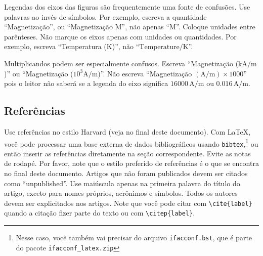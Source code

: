Legendas dos eixos das figuras são frequentemente uma fonte de confusões. Use
palavras ao invés de símbolos. Por exemplo, escreva a quantidade ``Magnetização'',
ou ``Magnetização M'', não apenas ``M''. Coloque unidades entre parênteses. Não marque
os eixos apenas com unidades ou quantidades. Por exemplo, escreva 
``Temperatura ($\mathrm{K}$)'', não ``$\mbox{Temperature}/\mathrm{K}$''.

Multiplicandos podem ser especialmente confusos. Escreva  ``Magnetização 
($\mathrm{kA}/\mathrm{m}$)'' ou ``Magnetização ($10^3 \mathrm{A}/\mathrm{m}$)''. 
Não escreva 
``Magnetização $(\mathrm{A}/\mathrm{m}) \times 1000$'' pois o leitor não saberá
se a legenda do eixo significa 
$16000\,\mathrm{A}/\mathrm{m}$ ou $0.016\,\mathrm{A}/\mathrm{m}$.

%

\subsection{Referências}

Use referências no estilo Harvard (veja no final deste documento). Com
\LaTeX, você pode processar uma base externa de dados bibliográficos 
usando \texttt{bibtex},\footnote{Nesse caso, você também vai precisar do arquivo \texttt{ifacconf.bst}, que é parte do pacote \texttt{ifacconf\_latex.zip}} ou então inserir
as referências diretamente na seção correspondente. Evite as notas de rodapé.
Por favor, note que o estilo preferido de referências é o que se encontra no
final deste documento. Artigos que não foram publicados devem ser citados 
como ``unpublished''. Use maiúscula apenas na primeira palavra do título
do artigo, exceto para nomes próprios, acrônimos e símbolos. Todos os autores
devem ser explicitados nos artigos. Note que você pode citar com \texttt{\textbackslash cite\{label\}} quando a citação fizer parte do texto ou com \texttt{\textbackslash citep\{label\}}.

